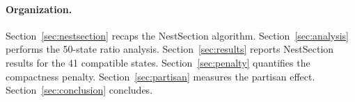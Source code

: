 \paragraph{Organization.}
Section~\ref{sec:nestsection} recaps the NestSection algorithm.
Section~\ref{sec:analysis} performs the 50-state ratio analysis.
Section~\ref{sec:results} reports NestSection results for the 41 compatible states.
Section~\ref{sec:penalty} quantifies the compactness penalty.
Section~\ref{sec:partisan} measures the partisan effect.
Section~\ref{sec:conclusion} concludes.
